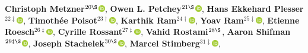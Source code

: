 \textbf{Christoph Metzner}$^{20\S}$\href{http://orcid.org/0000-0002-5933-2101}{\includegraphics[width=8pt]{orcid}},
\textbf{Owen L. Petchey}$^{21\S}$\href{http://orcid.org/0000-0002-7724-1633}{\includegraphics[width=8pt]{orcid}},
\textbf{Hans Ekkehard Plesser}$^{22\ddagger}$\href{http://orcid.org/0000-0001-7843-5993}{\includegraphics[width=8pt]{orcid}},
\textbf{Timothée Poisot}$^{23\dagger}$\href{http://orcid.org/0000-0002-0735-5184}{\includegraphics[width=8pt]{orcid}},
\textbf{Karthik Ram}$^{24\dagger}$\href{http://orcid.org/0000-0002-0233-1757}{\includegraphics[width=8pt]{orcid}},
\textbf{Yoav Ram}$^{25\ddagger}$\href{http://orcid.org/0000-0002-9653-4458}{\includegraphics[width=8pt]{orcid}},
\textbf{Etienne Roesch}$^{26\ddagger}$\href{http://orcid.org/0000-0002-8913-4173}{\includegraphics[width=8pt]{orcid}},
\textbf{Cyrille Rossant}$^{27\ddagger}$\href{http://orcid.org/0000-0003-2069-9093}{\includegraphics[width=8pt]{orcid}},
\textbf{Vahid Rostami}$^{28\S}$,
\textbf{Aaron Shifman}$^{29\ddagger\S}$\href{http://orcid.org/0000-0003-2140-7590}{\includegraphics[width=8pt]{orcid}},
\textbf{Joseph Stachelek}$^{30\S}$\href{http://orcid.org/0000-0002-5924-2464}{\includegraphics[width=8pt]{orcid}},
\textbf{Marcel Stimberg}$^{31\ddagger}$\href{http://orcid.org/0000-0002-2648-4790}{\includegraphics[width=8pt]{orcid}},
